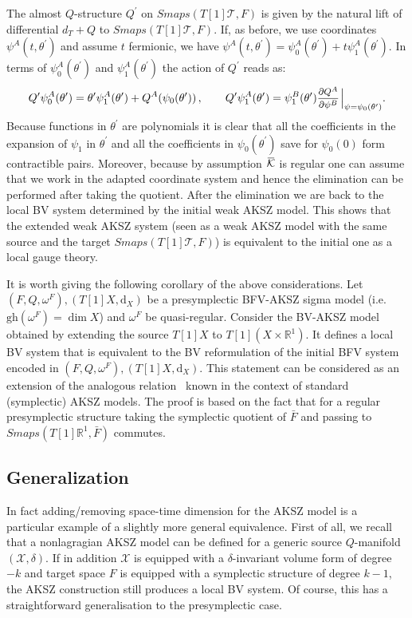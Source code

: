\documentclass[a4paper,12pt]{article}
\numberwithin{equation}{section} %
\newcommand{\gh}[1]{\mathrm{gh}(#1)}
\newcommand{\dx}{\mathrm{d}_X}
\renewcommand{\d}{\partial}
\newcommand{\ffrac}[2]{\raisebox{.5pt}%
  {\footnotesize$\displaystyle\frac{#1}{#2}$}\kern1pt}
\newcommand{\ddl}[2]{\ffrac{\d #1}{\d #2}}
\newcommand{\manifold}[1]{\mathscr{#1}}
\newcommand{\manX}{\manifold{X}}
\newcommand{\fR}{\mathbb{R}}
\def\cK{\mathcal{K}}
\def\cT{\mathcal{T}}
\numberwithin{equation}{section}
\newcommand{\overbar}[1]{\mkern 1.5mu\overline{\mkern-1.5mu#1\mkern-1.5mu}\mkern 1.5mu}
\begin{document}
The almost $Q$-structure $Q^\prime$ on $Smaps(T[1]\cT,F)$ is given by the natural lift of differential $d_T+Q$ to $Smaps(T[1]\cT,F)$. If, as before, we use coordinates $\psi^A(t,\theta^\prime)$ and assume $t$ fermionic,  we have $\psi^A(t,\theta^\prime)=\psi^A_0(\theta^\prime)+t \psi^A_1(\theta^\prime)$. In terms of $\psi^A_0(\theta^\prime)$ and $\psi^A_1(\theta^\prime)$ the action of $Q^\prime$ reads as:
\begin{equation}
Q^\prime \psi^A_0 (\theta^\prime)=\theta^\prime \psi^A_1(\theta^\prime)+Q^A(\psi_0(\theta^\prime))\,, \qquad 
Q^\prime \psi^A_1 (\theta^\prime)= \psi_1^B(\theta^\prime)\ddl{Q^A}{\psi^B}\Big|_{\psi=\psi_0(\theta^\prime)}.
\end{equation}
Because functions in $\theta^\prime$ are polynomials it is clear that all the coefficients in the expansion of $\psi_1$ in $\theta^\prime$ and all the coefficients in $\psi_0(\theta^\prime)$ save for $\psi_0(0)$ form contractible pairs. Moreover, because by assumption $\overbar{\cK}$ is regular one can assume that we work in the adapted coordinate system and hence the elimination can be performed after taking the quotient. After the elimination we are back to the local BV system determined by the initial weak AKSZ model. This shows that the extended weak AKSZ system (seen as a weak AKSZ model with the same source and the target $Smaps(T[1]\cT,F)$) is equivalent to the initial one as a local gauge theory. 

It is worth giving the following corollary of the above considerations. Let $(F,Q,\omega^F),(T[1]X,\dx)$ be a presymplectic BFV-AKSZ sigma model (i.e. $\gh{\omega^F}=\dim{X}$) and $\omega^F$ be quasi-regular. Consider the BV-AKSZ model obtained by extending the source $T[1]X$ to $T[1](X\times \fR^1)$. It defines a local BV system that is equivalent to the BV reformulation of the initial BFV system encoded in $(F,Q,\omega^F),(T[1]X,\dx)$. This statement can be considered as an extension of the analogous relation~\cite{Grigoriev:1999qz,Barnich:2003wj} known in the context of standard (symplectic) AKSZ models. The proof is based on the fact that for a regular presymplectic structure taking the symplectic quotient of $\bar F$ and passing to $Smaps(T[1]\fR^1,\bar F)$ commutes.     

\subsection{Generalization}\label{sec:generalAKSZ}

In fact adding/removing space-time dimension for the AKSZ model is a particular example of a slightly more general equivalence. First of all, we recall that a nonlagragian AKSZ model can be defined for a generic source $Q$-manifold $(\manX,\delta)$. If in addition $\manX$ is equipped 
with a $\delta$-invariant volume form of degree $-k$ and target space $F$ is equipped with a symplectic structure of degree $k-1$, the AKSZ construction still produces a local BV system. Of course, this has a straightforward generalisation to the presymplectic case.
\end{document}

